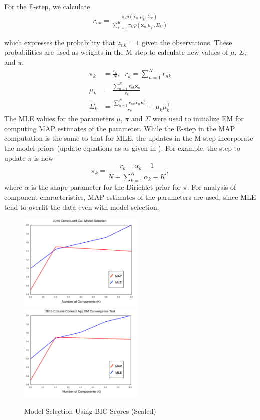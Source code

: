 \documentclass[twoside]{article}
\theoremstyle{theorem}
\theoremstyle{theorem}
\theoremstyle{theorem}
\theoremstyle{lemma}
\theoremstyle{definition}
\theoremstyle{example}
\begin{document}
For the E-step, we calculate   
\begin{align}
r_{nk} = \frac{\pi_k p\left(\mathbf{x}_n | \mu_k, \Sigma_k\right)}{\sum_{k'=1}^K \pi_{k'} p\left(\mathbf{x}_n | \mu_{k'}, \Sigma_{k'}\right)}
\end{align}

which expresses the probability that $z_{nk}=1$ given the observations. These probabilities are used as weights in the M-step to calculate new values of $\mu$, $\Sigma$, and $\pi$:
\begin{align}
\pi_k &= \frac{r_k}{N},\;\; r_k =\sum_{n=1}^N r_{nk}\\
\mu_k &=\frac{\sum_{n=1}^N r_{nk}\mathbf{x}_n}{r_k}\\
\Sigma_k &= \frac{\sum_{n=1}^N r_{nk} \mathbf{x}_n\mathbf{x}_n^\top}{r_k} - \mu_k\mu_k^\top
\end{align}
The MLE values for the parameters $\mu$, $\pi$ and $\Sigma$ were used to initialize EM for computing MAP estimates of the parameter. While the E-step in the MAP computation is the same to that for MLE, the updates in the M-step incorporate the model priors (update equations as as given in \cite{Bishop}). For example, the step to update $\pi$ is now 
\begin{equation} 
\pi_k = \frac{r_k + \alpha_k - 1}{N + \sum_{k=1}^K \alpha_k - K},
\end{equation}
where $\alpha$ is the shape parameter for the Dirichlet prior for $\pi$. 
For analysis of component characteristics, MAP estimates of the parameters are used, since MLE tend to overfit the data even with model selection. 
\begin{figure}[h!]
\begin{center}
\includegraphics[width=60mm]{Call_bic}
\includegraphics[width=60mm]{App_bic}
\caption{Model Selection Using BIC Scores (Scaled)}\label{fig:bic}
\end{center}
\vskip -0.2in
\end{figure} 
\end{document}
